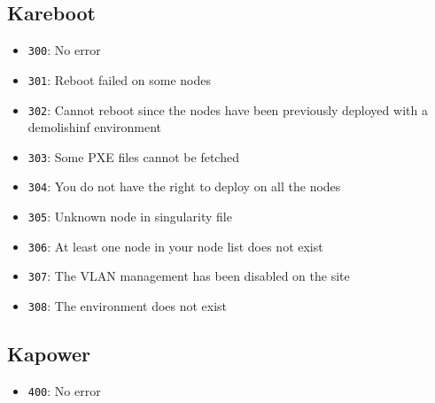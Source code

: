 \documentclass[a4wide,10pt,oneside]{book}
\begin{document}
\subsection{Kareboot}
\begin{itemize}
  \item \texttt{300}: No error
  \item \texttt{301}: Reboot failed on some nodes
  \item \texttt{302}: Cannot reboot since the nodes have been previously deployed with a demolishinf environment
  \item \texttt{303}: Some PXE files cannot be fetched
  \item \texttt{304}: You do not have the right to deploy on all the nodes
  \item \texttt{305}: Unknown node in singularity file
  \item \texttt{306}: At least one node in your node list does not exist
  \item \texttt{307}: The VLAN management has been disabled on the site
  \item \texttt{308}: The environment does not exist
\end{itemize}
\subsection{Kapower}
\begin{itemize}
  \item \texttt{400}: No error
\end{itemize}
\end{document}
